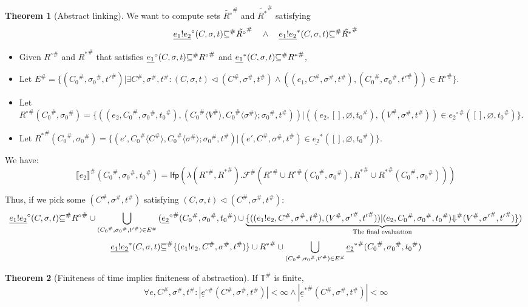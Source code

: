 \documentclass{article}
\theoremstyle{definition}
\newtheorem{thm}{Theorem}[section]
\def\ovbarw{1.2mu}
\def\ovbarh{0.8}
\newcommand*{\ovbar}[1]{\mkern \ovbarw\overline{\mkern-\ovbarw{\smash{#1}\scalebox{1}[\ovbarh]{\vphantom{i}}}\mkern-\ovbarw}\mkern \ovbarw}
\newcommand*{\A}[1]{{#1}^{\#}}
\newcommand*{\ATime}{\mathbb{T}^{\#}}
\newcommand*{\link}[2]{{#1}\mathtt{!}{#2}}
\newcommand*{\Reach}[1]{\underline{#1}^{*}}
\newcommand*{\Resolved}[1]{\underline{#1}^{\circ}}
\newcommand*{\sembracket}[1]{\lBrack{#1}\rBrack}
\newcommand*{\inject}[2]{{#1}\langle{#2}\rangle}
\begin{document}
\begin{thm}[Abstract linking]
  We want to compute sets $\tilde{R^{\circ}}^{\#}$ and $\tilde{R^{*}}^{\#}$ satisfying
  \[
    \Resolved{\link{e_1}{e_2}}(C,\sigma,t)\ovbar{\subseteq}^{\#} \tilde{R^{\circ}}^{\#}
    \quad\wedge\quad
    \Reach{\link{e_1}{e_2}}(C,\sigma,t)\ovbar{\subseteq}^{\#} \tilde{R^{*}}^{\#}
  \]

  \begin{itemize}
    \item Given ${R^{\circ}}^{\#}$ and ${R^{*}}^{\#}$ that satisfies $\Resolved{e_1}(C,\sigma,t)\ovbar{\subseteq}^{\#} {R^{\circ}}^{\#}$ and $\Reach{e_1}(C,\sigma,t)\ovbar{\subseteq}^{\#} {R^{*}}^{\#}$,
    \item Let $\A{E}=\{(\A{C_{0}},\A{\sigma_{0}},\A{t'})|\exists \A{C},\A{\sigma},\A{t}:(C,\sigma,t)\lhd(\A{C},\A{\sigma},\A{t})\wedge((e_{1},\A{C},\A{\sigma},\A{t}),(\A{C_{0}},\A{\sigma_{0}},\A{t'}))\in \A{R^{\circ}}\}$.
    \item Let $\A{R^{\circ}}(\A{C_{0}},\A{\sigma_{0}})=\{((e_{2},\A{C_{0}},\A{\sigma_{0}},\A{t_{0}}), (\inject{\A{C_{0}}}{\A{V}},\inject{\A{C_{0}}}{\A{\sigma}};\A{\sigma_{0}},\A{t}))|((e_{2},[],\varnothing,\A{t_{0}}),(\A{V},\A{\sigma},\A{t}))\in\A{\Resolved{e_{2}}}([],\varnothing,\A{t_{0}})\}$.
    \item Let $\A{R^{*}}(\A{C_{0}},\A{\sigma_{0}})=\{(e',\inject{\A{C_{0}}}{\A{C}},\inject{\A{C_{0}}}{\A{\sigma}};\A{\sigma_{0}},\A{t})|(e',\A{C},\A{\sigma},\A{t})\in\Reach{e_{2}}([],\varnothing,\A{t_{0}})\}$.
  \end{itemize}

  We have:
  \[
    \A{\sembracket{e_{2}}}(\A{C_{0}},\A{\sigma_{0}},\A{t_{0}})=\mathsf{lfp}(\lambda (\A{R^{\circ}}, \A{R^{*}}).\A{\mathcal{F}}(\A{R^{\circ}}\cup \A{R^{\circ}}(\A{C_{0}},\A{\sigma_{0}}), \A{R^{*}}\cup \A{R^{*}}(\A{C_{0}},\A{\sigma_{0}})))
  \]

  Thus, if we pick some $(\A{C},\A{\sigma},\A{t})$ satisfying $(C,\sigma,t)\lhd(\A{C},\A{\sigma},\A{t})$:
  \[
    \Resolved{\link{e_1}{e_2}}(C,\sigma,t)\A{\ovbar{\subseteq}}
    \A{R^{\circ}}\cup\bigcup_{(\A{C_{0}},\A{\sigma_{0}},\A{t'})\in \A{E}}{(\A{\Resolved{e_2}}(\A{C_{0}},\A{\sigma_{0}},\A{t_{0}})\cup\underbrace{\{((\link{e_1}{e_2}, \A{C}, \A{\sigma}, \A{t}), (\A{V},\A{\sigma'},\A{t'}))|(e_{2},\A{C_{0}},\A{\sigma_{0}},\A{t_{0}})\A{\Downarrow}(\A{V},\A{\sigma'},\A{t'})\}}_{\text{The final evaluation}})}
  \]
  \begin{align*}
    \Reach{\link{e_1}{e_2}}(C,\sigma,t)\A{\ovbar{\subseteq}}\{(\link{e_1}{e_2},\A{C},\A{\sigma},\A{t})\}\cup \A{R^{*}}\cup\bigcup_{(\A{C_{0}},\A{\sigma_{0}},\A{t'})\in \A{E}}{\A{\Reach{e_2}}(\A{C_{0}},\A{\sigma_{0}},\A{t_{0}})}
  \end{align*}
\end{thm}

\begin{thm}[Finiteness of time implies finiteness of abstraction]
  If $\ATime$ is finite,
  \[
    \forall e,\A{C},\A{\sigma},\A{t}: |\A{\Resolved{e}}(\A{C},\A{\sigma},\A{t})|<\infty\wedge|\A{\Reach{e}}(\A{C},\A{\sigma},\A{t})|<\infty
  \]
\end{thm}

\printbibliography
\end{document}
